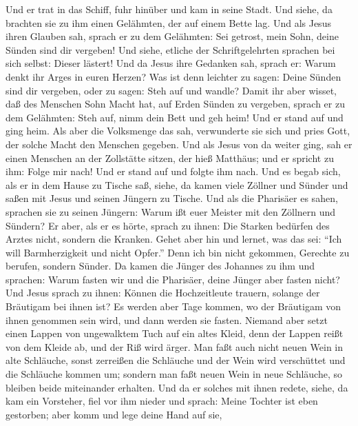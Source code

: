  Und er trat in das Schiff, fuhr hinüber und kam in seine
Stadt.  Und siehe, da brachten sie zu ihm einen Gelähmten,
der auf einem Bette lag. Und als Jesus ihren Glauben sah, sprach er zu
dem Gelähmten: Sei getrost, mein Sohn, deine Sünden sind dir vergeben!
 Und siehe, etliche der Schriftgelehrten sprachen bei sich
selbst: Dieser lästert!  Und da Jesus ihre Gedanken sah,
sprach er: Warum denkt ihr Arges in euren Herzen?  Was ist
denn leichter zu sagen: Deine Sünden sind dir vergeben, oder zu sagen:
Steh auf und wandle?  Damit ihr aber wisset, daß des
Menschen Sohn Macht hat, auf Erden Sünden zu vergeben, sprach er zu dem
Gelähmten: Steh auf, nimm dein Bett und geh heim!  Und er
stand auf und ging heim.  Als aber die Volksmenge das sah,
verwunderte sie sich und pries Gott, der solche Macht den Menschen
gegeben.  Und als Jesus von da weiter ging, sah er einen
Menschen an der Zollstätte sitzen, der hieß Matthäus; und er spricht zu
ihm: Folge mir nach! Und er stand auf und folgte ihm nach.
 Und es begab sich, als er in dem Hause zu Tische saß,
siehe, da kamen viele Zöllner und Sünder und saßen mit Jesus und seinen
Jüngern zu Tische.  Und als die Pharisäer es sahen,
sprachen sie zu seinen Jüngern: Warum ißt euer Meister mit den Zöllnern
und Sündern?  Er aber, als er es hörte, sprach zu ihnen:
Die Starken bedürfen des Arztes nicht, sondern die Kranken.
 Gehet aber hin und lernet, was das sei: ``Ich will
Barmherzigkeit und nicht Opfer.'' Denn ich bin nicht gekommen, Gerechte
zu berufen, sondern Sünder.  Da kamen die Jünger des
Johannes zu ihm und sprachen: Warum fasten wir und die Pharisäer, deine
Jünger aber fasten nicht?  Und Jesus sprach zu ihnen:
Können die Hochzeitleute trauern, solange der Bräutigam bei ihnen ist?
Es werden aber Tage kommen, wo der Bräutigam von ihnen genommen sein
wird, und dann werden sie fasten.  Niemand aber setzt
einen Lappen von ungewalktem Tuch auf ein altes Kleid, denn der Lappen
reißt von dem Kleide ab, und der Riß wird ärger.  Man
faßt auch nicht neuen Wein in alte Schläuche, sonst zerreißen die
Schläuche und der Wein wird verschüttet und die Schläuche kommen um;
sondern man faßt neuen Wein in neue Schläuche, so bleiben beide
miteinander erhalten.  Und da er solches mit ihnen
redete, siehe, da kam ein Vorsteher, fiel vor ihm nieder und sprach:
Meine Tochter ist eben gestorben; aber komm und lege deine Hand auf sie,
